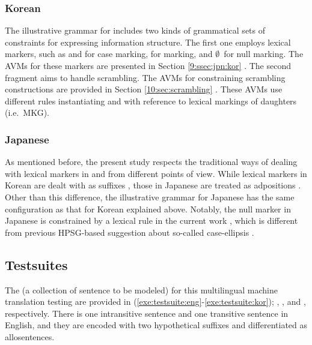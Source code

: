 \subsubsection{Korean}
\label{13:ssec:kor}


The illustrative grammar for  includes two kinds of
grammatical sets of constraints for expressing information
structure. The first one employs lexical markers,
such as \ika and \lul for case marking, \nun for  marking,
and \ensuremath{\emptyset}~for null marking. The AVMs for these
markers are presented in Section
\ref{9:ssec:jpn:kor} .  The second fragment
aims to handle scrambling. The AVMs for constraining scrambling
constructions are provided in Section
\ref{10:sec:scrambling} . These
AVMs use different rules instantiating  and
 with reference to lexical markings of daughters
(i.e.\ MKG).


\subsubsection{Japanese}
\label{13:ssec:jpn}



As mentioned before, the present study respects the
traditional ways of dealing with lexical markers in  and
 from different points of view. While lexical markers in
Korean are dealt with as suffixes \citep{kim:yang:04}, those in
Japanese are treated as adpositions
\citep{siegel:99}. Other than
this difference, the illustrative grammar for Japanese has the same
configuration as that for Korean explained above. Notably, the null
marker in Japanese is constrained by a lexical rule in the current
work , which is different from previous
HPSG-based suggestion about so-called case-ellipsis
\citep{yatabe:99,sato:tam:12}.




\subsection{Testsuites}
\label{13:ssec:testsuites}


The  (a collection of sentence to be modeled) for this
multilingual machine translation testing are provided in
(\ref{exe:testsuite:eng}-\ref{exe:testsuite:kor}); ,
, and , respectively.  There is one
intransitive sentence and one transitive sentence in English, and they
are encoded with two hypothetical suffixes and differentiated as
allosentences.



